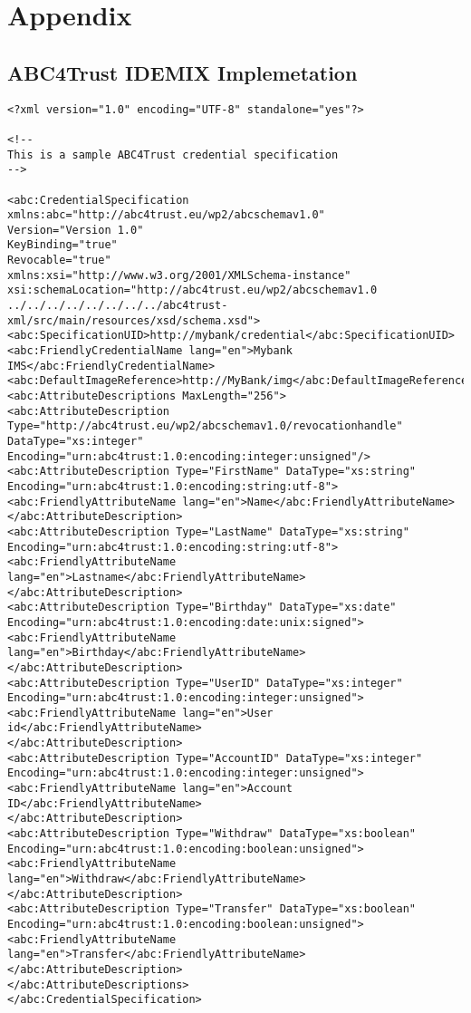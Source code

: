 \chapter{Appendix}
\section{ABC4Trust IDEMIX Implemetation}
\lstset{language=XML}
\begin{lstlisting}[caption=IDEMIX Credential Specificataion]
<?xml version="1.0" encoding="UTF-8" standalone="yes"?>

<!--
This is a sample ABC4Trust credential specification
-->

<abc:CredentialSpecification xmlns:abc="http://abc4trust.eu/wp2/abcschemav1.0"
Version="Version 1.0"
KeyBinding="true"
Revocable="true"
xmlns:xsi="http://www.w3.org/2001/XMLSchema-instance" 
xsi:schemaLocation="http://abc4trust.eu/wp2/abcschemav1.0 ../../../../../../../../abc4trust-xml/src/main/resources/xsd/schema.xsd">
<abc:SpecificationUID>http://mybank/credential</abc:SpecificationUID>
<abc:FriendlyCredentialName lang="en">Mybank IMS</abc:FriendlyCredentialName>
<abc:DefaultImageReference>http://MyBank/img</abc:DefaultImageReference>
<abc:AttributeDescriptions MaxLength="256">
<abc:AttributeDescription Type="http://abc4trust.eu/wp2/abcschemav1.0/revocationhandle" DataType="xs:integer" Encoding="urn:abc4trust:1.0:encoding:integer:unsigned"/>
<abc:AttributeDescription Type="FirstName" DataType="xs:string" Encoding="urn:abc4trust:1.0:encoding:string:utf-8">
<abc:FriendlyAttributeName lang="en">Name</abc:FriendlyAttributeName>
</abc:AttributeDescription>
<abc:AttributeDescription Type="LastName" DataType="xs:string" Encoding="urn:abc4trust:1.0:encoding:string:utf-8">
<abc:FriendlyAttributeName lang="en">Lastname</abc:FriendlyAttributeName>
</abc:AttributeDescription>
<abc:AttributeDescription Type="Birthday" DataType="xs:date" Encoding="urn:abc4trust:1.0:encoding:date:unix:signed">
<abc:FriendlyAttributeName lang="en">Birthday</abc:FriendlyAttributeName>
</abc:AttributeDescription>
<abc:AttributeDescription Type="UserID" DataType="xs:integer" Encoding="urn:abc4trust:1.0:encoding:integer:unsigned">
<abc:FriendlyAttributeName lang="en">User id</abc:FriendlyAttributeName>
</abc:AttributeDescription>
<abc:AttributeDescription Type="AccountID" DataType="xs:integer" Encoding="urn:abc4trust:1.0:encoding:integer:unsigned">
<abc:FriendlyAttributeName lang="en">Account ID</abc:FriendlyAttributeName>
</abc:AttributeDescription>
<abc:AttributeDescription Type="Withdraw" DataType="xs:boolean" Encoding="urn:abc4trust:1.0:encoding:boolean:unsigned">
<abc:FriendlyAttributeName lang="en">Withdraw</abc:FriendlyAttributeName>
</abc:AttributeDescription>
<abc:AttributeDescription Type="Transfer" DataType="xs:boolean" Encoding="urn:abc4trust:1.0:encoding:boolean:unsigned">
<abc:FriendlyAttributeName lang="en">Transfer</abc:FriendlyAttributeName>
</abc:AttributeDescription>
</abc:AttributeDescriptions>
</abc:CredentialSpecification>
\end{lstlisting}
